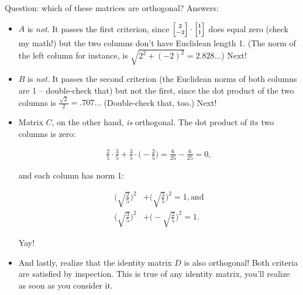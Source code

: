 \smallskip
Question: which of these matrices are orthogonal? Answers:

\vspace{-.1in}
\begin{itemize}
\itemsep.9em

\item $A$ is \textit{not}. It passes the first criterion, since
${\scriptsize \begin{bmatrix} 2 \\ -2 \end{bmatrix}} \cdot
{\scriptsize \begin{bmatrix} 1 \\ 1 \end{bmatrix}}$ does equal zero (check my
math!) but the two columns don't have Euclidean length 1. (The norm of the
left column for instance, is $\sqrt{2^2 + (-2)^2} = 2.828\dots$) Next!

\item $B$ is \textit{not}. It passes the second criterion (the Euclidean norms of both
columns are 1 -- double-check that) but not the first, since the dot product of
the two columns is $\frac{\sqrt{2}}{2} = .707\dots$ (Double-check that, too.)
Next!

\item Matrix $C$, on the other hand, \textit{is} orthogonal. The dot product of
its two columns is zero:

\vspace{-.15in}
\begin{align*}
\frac{2}{5} \cdot \frac{3}{5} + 
\frac{3}{5} \cdot \Big(-\frac{2}{5}\Big) = \frac{6}{25} - \frac{6}{25} = 0,
\end{align*}
\vspace{-.15in}

and each column has norm 1:

\vspace{-.15in}
\begin{align*}
\Bigg(\sqrt{\frac{2}{5}}\Bigg)^2 &+ \Bigg(\sqrt{\frac{3}{5}}\Bigg)^2 = 1,
\textrm{and} \\
\Bigg(\sqrt{\frac{3}{5}}\Bigg)^2 &+ \Bigg(-\sqrt{\frac{2}{5}}\Bigg)^2 = 1.
\end{align*}
\vspace{-.15in}

Yay!

\item And lastly, realize that the identity matrix $D$ is also orthogonal! Both
criteria are satisfied by inspection. This is true of any identity matrix,
you'll realize as soon as you consider it.

\end{itemize}

